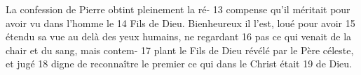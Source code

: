 La confession de Pierre obtint pleinement la ré-	 
13	 	compense qu'il méritait pour avoir vu dans l'homme le	 
14	 	Fils de Dieu. Bienheureux il l'est, loué pour avoir	 
15	 	étendu sa vue au delà des yeux humains, ne regardant	 
16	 	pas ce qui venait de la chair et du sang, mais contem-	 
17	 	plant le Fils de Dieu révélé par le Père céleste, et jugé	 
18	 	digne de reconnaître le premier ce qui dans le Christ était	 
19	 	de Dieu. 
